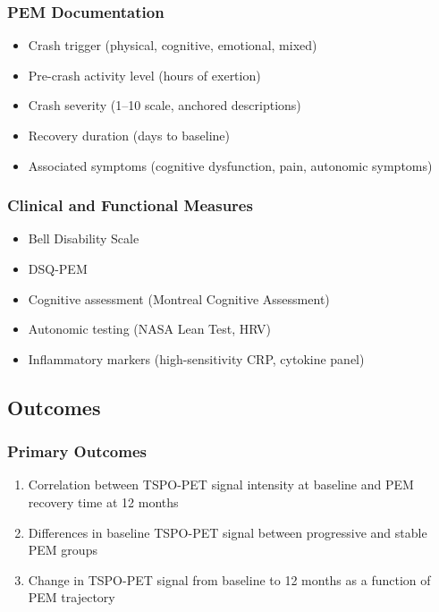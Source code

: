 \subsubsection{PEM Documentation}
\begin{itemize}
    \item Crash trigger (physical, cognitive, emotional, mixed)
    \item Pre-crash activity level (hours of exertion)
    \item Crash severity (1--10 scale, anchored descriptions)
    \item Recovery duration (days to baseline)
    \item Associated symptoms (cognitive dysfunction, pain, autonomic symptoms)
\end{itemize}

\subsubsection{Clinical and Functional Measures}
\begin{itemize}
    \item Bell Disability Scale
    \item DSQ-PEM
    \item Cognitive assessment (Montreal Cognitive Assessment)
    \item Autonomic testing (NASA Lean Test, HRV)
    \item Inflammatory markers (high-sensitivity CRP, cytokine panel)
\end{itemize}

\subsection{Outcomes}

\subsubsection{Primary Outcomes}
\begin{enumerate}
    \item Correlation between TSPO-PET signal intensity at baseline and PEM recovery time at 12 months
    \item Differences in baseline TSPO-PET signal between progressive and stable PEM groups
    \item Change in TSPO-PET signal from baseline to 12 months as a function of PEM trajectory
\end{enumerate}

